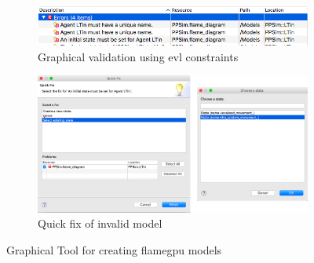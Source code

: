 \documentclass{UoYCSproject}
\begin{document}
\begin{figure}[htp]\ContinuedFloat
\centering
\begin{subfigure}{\textwidth}
\centering
\includegraphics[width=\textwidth]{Appendix/validation_gmf}
\caption{Graphical validation using \acrshort{evl} constraints}
\label{fig:validation_gmf}
\end{subfigure}

\begin{subfigure}{\textwidth}
\centering
\includegraphics[width=\textwidth]{Appendix/validation_quickfix_gmf}
\caption{Quick fix of invalid model}
\label{fig:validation_quickfix_gmf}
\end{subfigure}%

\caption{Graphical Tool for creating \acrshort{flamegpu} models}
\label{fig:gmf}
\end{figure}
 
\end{document}
